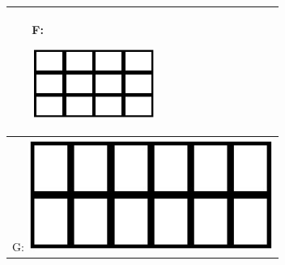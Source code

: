 \begin{table}[H]
\begin{tabular}{@{}|p{4cm}|p{4cm}|p{4cm}|}
\begin{center}
		\end{center} &
		F:
		\begin{center}
			\includegraphics[width=4cm]{imagenes/panelF}
		\end{center} 
		\\ \hline
		\multicolumn{3}{|c|}{G: \includegraphics[width=8cm]{imagenes/panelG}} \\ \hline
	\end{tabular}		
	\label{tabla:PANELES}
\end{table}

